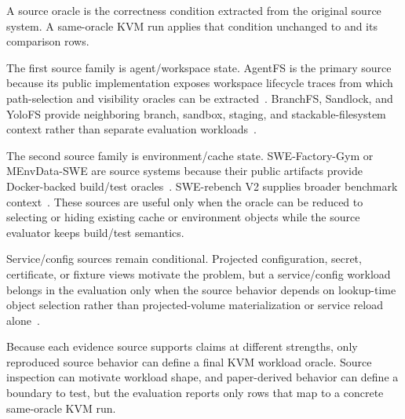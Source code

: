 A source oracle is the correctness condition extracted from the original source
system. A same-oracle KVM run applies that condition unchanged to \namei and its
comparison rows.

The first source family is agent/workspace state. AgentFS is the primary source
because its public implementation exposes workspace lifecycle traces
from which path-selection and visibility oracles can be extracted~\cite{agentfs_repo}.
BranchFS, Sandlock, and YoloFS provide neighboring branch, sandbox, staging,
and stackable-filesystem context rather than separate evaluation
workloads~\cite{branchfs_repo,sandlock_repo,yolofs_repo}.

The second source family is environment/cache state. SWE-Factory-Gym or
MEnvData-SWE are source systems because their public artifacts provide
Docker-backed build/test oracles~\cite{swe_factory_repo,menvagent_repo}.
SWE-rebench V2 supplies broader benchmark context~\cite{swe_rebench_v2_repo}.
These sources are useful only when the oracle can be reduced to selecting or
hiding existing cache or environment objects while the source evaluator keeps
build/test semantics.

Service/config sources remain conditional. Projected configuration, secret,
certificate, or fixture views motivate the problem, but a service/config
workload belongs in the evaluation only when the source behavior depends on
lookup-time object selection rather than projected-volume materialization or
service reload alone~\cite{kubernetes_projected_volumes}.

Because each evidence source supports claims at different strengths, only
reproduced source behavior can define a final KVM workload oracle. Source
inspection can motivate workload shape, and paper-derived behavior can define a
boundary to test, but the evaluation reports only rows that map to a concrete
same-oracle KVM run.

